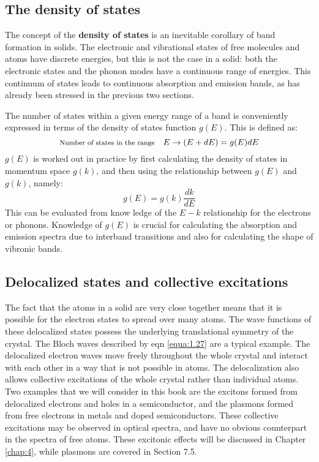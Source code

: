 \documentclass[12pt]{book}
\begin{document}
\subsection{The density of states}

The concept of the \textbf{density of states} is an inevitable corollary of band formation in solids. The electronic and vibrational states of free molecules and atoms have discrete energies, but this is not the case in a solid: both the electronic states and the phonon modes have a continuous range of energies. This continuum of states leads to continuous absorption and emission bands, as has already been stressed in the previous two sections.

The number of states within a given energy range of a band is conveniently expressed in terms of the density of states function $g(E)$. This is defined as:
\begin{equation}\label{equa:1.28}
    \text{\footnotesize{Number of states in the range}}\quad E\rightarrow(E+dE)=g(E)dE
\end{equation}
$g(E)$ is worked out in practice by first calculating the density of states in momentum space $g(k)$, and then using the relationship between $g(E)$ and $g(k)$, namely:
\begin{equation}\label{equa:1.29}
  g(E)=g(k)\frac{dk}{dE}
\end{equation}
This can be evaluated from know ledge of the $E-k$ relationship for the electrons or phonons. Knowledge of $g(E)$ is crucial for calculating the absorption and emission spectra due to interband transitions and also for calculating the shape of vibronic bands.

\subsection{Delocalized states and collective excitations}

The fact that the atoms in a solid are very close together means that it is possible for the electron states to spread over many atoms. The wave functions of these delocalized states possess the underlying translational symmetry of the crystal. The Bloch waves described by eqn \ref{equa:1.27} are a typical example. The delocalized electron waves move freely throughout the whole crystal and interact with each other in a way that is not possible in atoms. The delocalization also allows collective excitations of the whole crystal rather than individual atoms. Two examples that we will consider in this book are the excitons formed from delocalized electrons and holes in a semiconductor, and the plasmons formed from free electrons in metals and doped semiconductors. These collective excitations may be observed in optical spectra, and have no obvious counterpart in the spectra of free atoms. These excitonic effects will be discussed in Chapter \ref{chap:4}, while plasmons are covered in Section 7.5.
\end{document}
